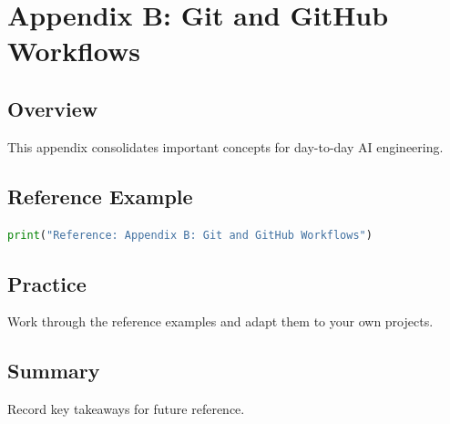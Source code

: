 \chapter{Appendix B: Git and GitHub Workflows}
\label{chap:vol12-2}



\section{Overview}
This appendix consolidates important concepts for day-to-day AI engineering.

\section{Reference Example}
\begin{lstlisting}[language=Python]
print("Reference: Appendix B: Git and GitHub Workflows")
\end{lstlisting}

\section{Practice}
\begin{exercise}
Work through the reference examples and adapt them to your own projects.
\end{exercise}

\section{Summary}
Record key takeaways for future reference.
